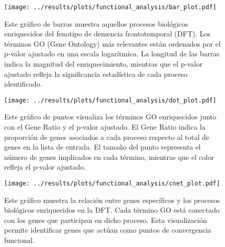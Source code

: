 \begin{figure}[htbp]
	\centering
	\texttt{[image: ../results/plots/functional\_analysis/bar\_plot.pdf]}
	\caption{Este gráfico de barras muestra aquellos procesos biológicos enriquecidos del fenotipo de demencia frontotemporal (DFT). Los términos GO (Gene Ontology) más relevantes están ordenados por el p-valor ajustado en una escala logarítmica. La longitud de las barras indica la magnitud del enriquecimiento, mientras que el p-valor ajustado refleja la significancia estadística de cada proceso identificado​.}
	\label{fig:bar_plot}
\end{figure}

\begin{figure}[htbp]
	\centering
	\texttt{[image: ../results/plots/functional\_analysis/dot\_plot.pdf]}
	\caption{Este gráfico de puntos visualiza los términos GO enriquecidos junto con el Gene Ratio y el p-valor ajustado. El Gene Ratio indica la proporción de genes asociados a cada proceso respecto al total de genes en la lista de entrada. El tamaño del punto representa el número de genes implicados en cada término, mientras que el color refleja el p-valor ajustado.}
	\label{fig:dot_plot}
\end{figure}

\begin{figure}[htbp]
	\centering
	\texttt{[image: ../results/plots/functional\_analysis/cnet\_plot.pdf]}
	\caption{Este gráfico muestra la relación entre genes específicos y los procesos biológicos enriquecidos en la DFT. Cada término GO está conectado con los genes que participan en dicho proceso. Esta visualización permite identificar genes que actúan como puntos de convergencia funcional.}
	\label{fig:cnet_plot}
\end{figure}

